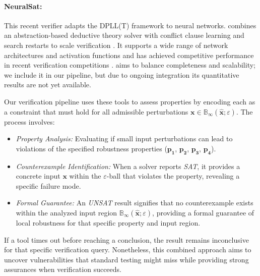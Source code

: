   \paragraph{NeuralSat:}  This recent verifier adapts the DPLL(T) framework to neural networks.  \neuralsat{} combines an abstraction-based deductive theory solver with conflict clause learning and search restarts to scale verification \cite{duong2024dpllt}.  It supports a wide range of network architectures and activation functions and has achieved competitive performance in recent verification competitions \cite{duong2025neuralsat}.  \neuralsat{} aims to balance completeness and scalability; we include it in our pipeline, but due to ongoing integration its quantitative results are not yet available.
  
  
  Our verification pipeline uses these tools to assess properties by encoding each as a constraint that must hold for all admissible perturbations \(\boldsymbol{x} \in \mathbb{B}_\infty(\boldsymbol{\hat{x}}; \varepsilon)\). The process involves:
  \begin{itemize}
      \item \emph{Property Analysis:} Evaluating if small input perturbations can lead to violations of the specified robustness properties ($\mathbf{p_1}$, $\mathbf{p_2}$, $\mathbf{p_3}$, $\mathbf{p_4}$).
      \item \emph{Counterexample Identification:} When a solver reports \emph{SAT}, it provides a concrete input \(\boldsymbol{x}\) within the \(\varepsilon\)-ball that violates the property, revealing a specific failure mode.
      \item \emph{Formal Guarantee:} An \emph{UNSAT} result signifies that no counterexample exists within the analyzed input region \(\mathbb{B}_\infty(\boldsymbol{\hat{x}}; \varepsilon)\), providing a formal guarantee of local robustness for that specific property and input region.
  \end{itemize}
  If a tool times out before reaching a conclusion, the result remains inconclusive for that specific verification query. Nonetheless, this combined approach aims to uncover vulnerabilities that standard testing might miss while providing strong assurances when verification succeeds.
